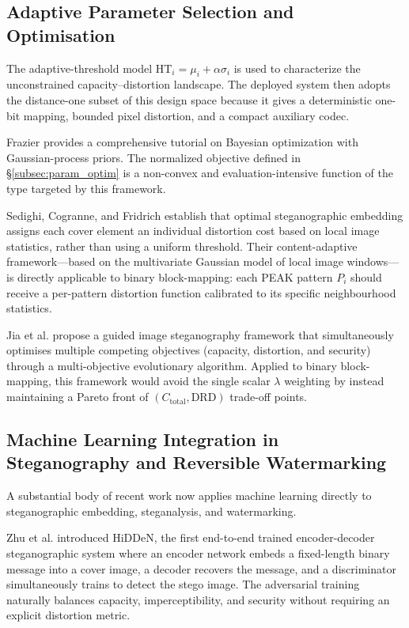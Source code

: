 \documentclass[a4paper,fleqn]{cas-dc}
\begin{document}
\subsection{Adaptive Parameter Selection and Optimisation}

The adaptive-threshold model
$\text{HT}_i=\mu_i+\alpha\sigma_i$ is used to characterize the unconstrained
capacity--distortion landscape. The deployed system then adopts the
distance-one subset of this design space because it gives a deterministic
one-bit mapping, bounded pixel distortion, and a compact auxiliary codec.

Frazier \cite{Frazier2018Bayesian} provides a comprehensive tutorial on
Bayesian optimization with Gaussian-process priors. The normalized objective
defined in \S\ref{subsec:param_optim} is a non-convex and evaluation-intensive
function of the type targeted by this framework.

Sedighi, Cogranne, and Fridrich \cite{Sedighi2018Content} establish that optimal steganographic embedding assigns each cover element an individual distortion cost based on local image statistics, rather than using a uniform threshold. Their content-adaptive framework---based on the multivariate Gaussian model of local image windows---is directly applicable to binary block-mapping: each PEAK pattern $P_i$ should receive a per-pattern distortion function calibrated to its specific neighbourhood statistics.

Jia et al. \cite{Jia2019Guided} propose a guided image steganography framework that simultaneously optimises multiple competing objectives (capacity, distortion, and security) through a multi-objective evolutionary algorithm. Applied to binary block-mapping, this framework would avoid the single scalar $\lambda$ weighting by instead maintaining a Pareto front of $(C_{\text{total}}, \text{DRD})$ trade-off points.

\subsection{Machine Learning Integration in Steganography and Reversible Watermarking}

A substantial body of recent work now applies machine learning directly to steganographic embedding, steganalysis, and watermarking.

Zhu et al. \cite{Zhu2018HiDDeN} introduced HiDDeN, the first end-to-end trained encoder-decoder steganographic system where an encoder network embeds a fixed-length binary message into a cover image, a decoder recovers the message, and a discriminator simultaneously trains to detect the stego image. The adversarial training naturally balances capacity, imperceptibility, and security without requiring an explicit distortion metric.
\end{document}
